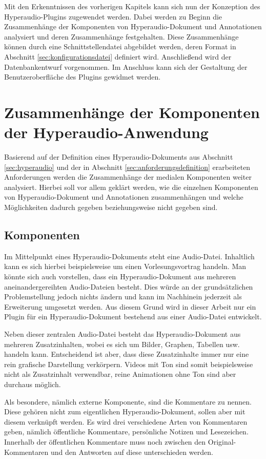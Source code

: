 Mit den Erkenntnissen des vorherigen Kapitels kann sich nun der Konzeption des Hyperaudio-Plugins zugewendet werden. Dabei werden zu Beginn die Zusammenhänge der Komponenten von Hyperaudio-Dokument und Annotationen analysiert und deren Zusammenhänge festgehalten. Diese Zusammenhänge können durch eine Schnittstellendatei abgebildet werden, deren Format in Abschnitt \ref{sec:konfigurationsdatei} definiert wird. Anschließend wird der Datenbankentwurf vorgenommen. Im Anschluss kann sich der Gestaltung der Benutzeroberfläche des Plugins gewidmet werden.


\section{Zusammenhänge der Komponenten der Hyperaudio-Anwendung}
Basierend auf der Definition eines Hyperaudio-Dokuments aus Abschnitt \ref{sec:hyperaudio} und der in Abschnitt \ref{sec:anforderungsdefinition} erarbeiteten Anforderungen werden die Zusammenhänge der medialen Komponenten weiter analysiert. Hierbei soll vor allem geklärt werden, wie die einzelnen Komponenten von Hyperaudio-Dokument und Annotationen zusammenhängen und welche Möglichkeiten dadurch gegeben beziehungsweise nicht gegeben sind.


\subsection{Komponenten}
Im Mittelpunkt eines Hyperaudio-Dokuments steht eine Audio-Datei. Inhaltlich kann es sich hierbei beispielsweise um einen Vorlesungsvortrag handeln. Man könnte sich auch vorstellen, dass ein Hyperaudio-Dokument aus mehreren aneinandergereihten Audio-Dateien besteht. Dies würde an der grundsätzlichen Problemstellung jedoch nichts ändern und kann im Nachhinein jederzeit als Erweiterung umgesetzt werden. Aus diesem Grund wird in dieser Arbeit nur ein Plugin für ein Hyperaudio-Dokument bestehend aus einer Audio-Datei entwickelt.

Neben dieser zentralen Audio-Datei besteht das Hyperaudio-Dokument aus mehreren Zusatzinhalten, wobei es sich um Bilder, Graphen, Tabellen usw. handeln kann. Entscheidend ist aber, dass diese Zusatzinhalte immer nur eine rein grafische Darstellung verkörpern. Videos mit Ton sind somit beispielsweise nicht als Zusatzinhalt verwendbar, reine Animationen ohne Ton sind aber durchaus möglich.

Als besondere, nämlich externe Komponente, sind die Kommentare zu nennen. Diese gehören nicht zum eigentlichen Hyperaudio-Dokument, sollen aber mit diesem verknüpft werden. Es wird drei verschiedene Arten von Kommentaren geben, nämlich  öffentliche Kommentare, persönliche Notizen und Lesezeichen. Innerhalb der öffentlichen Kommentare muss noch zwischen den Original-Kommentaren und den Antworten auf diese unterschieden werden. 


